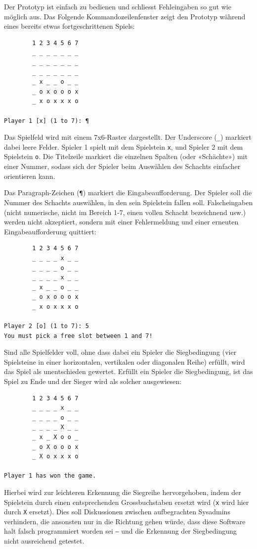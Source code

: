 \documentclass[a4paper,11pt,hidelinks]{scrartcl}
\begin{document}
Der Prototyp ist einfach zu bedienen und schliesst Fehleingaben so gut wie möglich aus. Das Folgende Kommandozeilenfenster zeigt den Prototyp während eines bereits etwas fortgeschrittenen Spiels:

\begin{lstlisting}
        1 2 3 4 5 6 7
        _ _ _ _ _ _ _
        _ _ _ _ _ _ _
        _ _ _ _ _ _ _
        _ x _ _ o _ _
        _ o x o o o x
        _ x o x x x o

Player 1 [x] (1 to 7): ¶
\end{lstlisting}

Das Spielfeld wird mit einem 7x6-Raster dargestellt. Der Underscore (\texttt{\_}) markiert dabei leere Felder. Spieler 1 spielt mit dem Spielstein \texttt{x}, und Spieler 2 mit dem Spielstein \texttt{o}. Die Titelzeile markiert die einzelnen Spalten (oder «Schächte») mit einer Nummer, sodass sich der Spieler beim Auswählen des Schachts einfacher orientieren kann.

Das Paragraph-Zeichen (\texttt{¶}) markiert die Eingabeaufforderung. Der Spieler soll die Nummer des Schachts auswählen, in den sein Spielstein fallen soll. Falscheingaben (nicht numerische, nicht im Bereich 1-7, einen vollen Schacht bezeichnend usw.) werden nicht akzeptiert, sondern mit einer Fehlermeldung und einer erneuten Eingabeaufforderung quittiert:

\begin{lstlisting}
        1 2 3 4 5 6 7
        _ _ _ _ x _ _
        _ _ _ _ o _ _
        _ _ _ _ x _ _
        _ x _ _ o _ _
        _ o x o o o x
        _ x o x x x o

Player 2 [o] (1 to 7): 5
You must pick a free slot between 1 and 7!
\end{lstlisting}

Sind alle Spielfelder voll, ohne dass dabei ein Spieler die Siegbedingung (vier Spielsteine in einer horizontalen, vertikalen oder diagonalen Reihe) erfüllt, wird das Spiel als unentschieden gewertet. Erfüllt ein Spieler die Siegbedingung, ist das Spiel zu Ende und der Sieger wird als solcher ausgewiesen:

\begin{lstlisting}
        1 2 3 4 5 6 7
        _ _ _ _ x _ _
        _ _ _ _ o _ _
        _ _ _ _ X _ _
        _ x _ X o o _
        _ o X o o o x
        _ X o x x x o

Player 1 has won the game.
\end{lstlisting}

Hierbei wird zur leichteren Erkennung die Siegreihe hervorgehoben, indem der Spielstein durch einen entsprechenden Grossbuchstaben ersetzt wird (\texttt{x} wird hier durch \texttt{X} ersetzt). Dies soll Diskussionen zwischen aufbegrachten Sysadmins verhindern, die ansonsten nur in die Richtung gehen würde, dass diese Software halt falsch programmiert worden sei ‒ und die Erkennung der Siegbedingung nicht ausreichend getestet.
\end{document}
